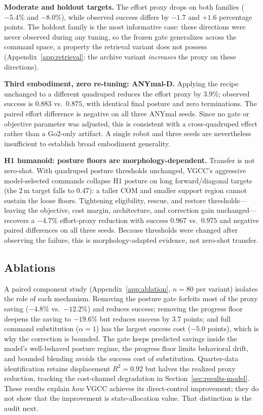 \documentclass{article}
\begin{document}
\textbf{Moderate and holdout targets.}
The effort proxy drops on both families ($-5.4\%$ and $-8.0\%$), while observed
success differs by $-1.7$ and $+1.6$ percentage points. The holdout family is the
most informative case: these directions were never observed during any tuning, so
the frozen gate generalizes across the command space, a property the retrieval
variant does not possess (Appendix~\ref{app:retrieval}: the archive variant
\emph{increases} the proxy on these directions).

\textbf{Third embodiment, zero re-tuning: ANYmal-D.}
Applying the recipe unchanged to a different quadruped reduces the effort proxy by
$3.9\%$; observed success is $0.883$ vs.\ $0.875$, with identical final posture and
zero terminations. The paired effort difference is negative on all three ANYmal
seeds. Since no gate or objective parameter was adjusted, this is consistent with a
cross-quadruped effect rather than a Go2-only artifact. A single robot and three
seeds are nevertheless insufficient to establish broad embodiment generality.

\textbf{H1 humanoid: posture floors are morphology-dependent.}
Transfer is not zero-shot. With quadruped posture thresholds unchanged, VGCC's
aggressive model-selected commands collapse H1 posture on long forward/diagonal
targets (the $2$\,m target falls to $0.47$): a taller COM and smaller support
region cannot sustain the loose floors. Tightening eligibility, rescue, and
restore thresholds---leaving the objective, cost margin, architecture, and
correction gain unchanged---recovers a $-4.7\%$ effort-proxy reduction with
success $0.967$ vs.\ $0.975$ and negative paired differences on all three seeds.
Because thresholds were changed after observing the failure, this is
morphology-adapted evidence, not zero-shot transfer.

\subsection{Ablations}
\label{sec:results-ablation}

A paired component study (Appendix~\ref{app:ablation}, $n=80$ per variant) isolates
the role of each mechanism. Removing the posture gate forfeits most of the proxy
saving ($-4.8\%$ vs.\ $-12.2\%$) and reduces success; removing the progress floor
deepens the saving to $-19.6\%$ but reduces success by $3.7$ points; and full
command substitution ($\alpha=1$) has the largest success cost ($-5.0$ points),
which is why the correction is bounded. The gate keeps predicted savings inside the
model's well-behaved posture regime, the progress floor limits behavioral drift,
and bounded blending avoids the success cost of substitution. Quarter-data
identification retains displacement $R^2=0.92$ but halves the realized proxy
reduction, tracking the cost-channel degradation in Section~\ref{sec:results-model}.
These results explain \emph{how} VGCC achieves its direct-control improvement; they
do not show that the improvement is state-allocation value. That distinction is
the audit next.
\end{document}
